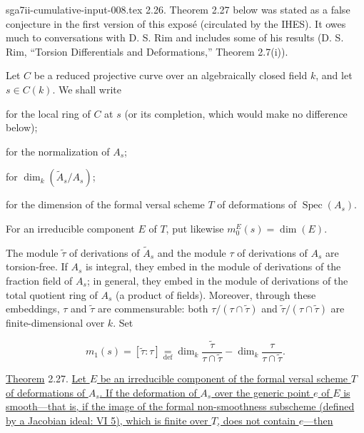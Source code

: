 \begin{filecontents*}{sga7ii-cumulative-input-008.tex}
2.26. Theorem 2.27 below was stated as a false conjecture in the first version
of this exposé (circulated by the IHES).  It owes much to conversations with
D. S. Rim and includes some of his results (D. S. Rim, ``Torsion
Differentials and Deformations,'' Theorem 2.7(i)).


Let $C$ be a reduced projective curve over an algebraically closed field $k$,
and let $s\in C(k)$.  We shall write

\begin{description}[leftmargin=2.7cm,style=nextline]
\item[$A_s$] for the local ring of $C$ at $s$ (or its completion, which would
make no difference below);
\item[$\widetilde A_s$] for the normalization of $A_s$;
\item[$\delta(s)$] for $\dim_k(\widetilde A_s/A_s)$;
\item[$m_0(s)$] for the dimension of the formal versal scheme $T$ of
deformations of $\operatorname{Spec}(A_s)$.
\end{description}

For an irreducible component $E$ of $T$, put likewise
$m_0^E(s)=\dim(E)$.

The module $\widetilde\tau$ of derivations of $\widetilde A_s$ and the module
$\tau$ of derivations of $A_s$ are torsion-free.  If $A_s$ is integral, they
embed in the module of derivations of the fraction field of $A_s$; in general,
they embed in the module of derivations of the total quotient ring of $A_s$
(a product of fields).  Moreover, through these embeddings, $\tau$ and
$\widetilde\tau$ are commensurable: both
$\tau/(\tau\cap\widetilde\tau)$ and
$\widetilde\tau/(\tau\cap\widetilde\tau)$ are finite-dimensional over $k$.
Set

\begin{equation*}
m_1(s)=[\widetilde\tau:\tau]
\mathrel{\mathop=\limits_{\mathrm{def}}}
\dim_k\frac{\widetilde\tau}{\tau\cap\widetilde\tau}
-\dim_k\frac{\tau}{\tau\cap\widetilde\tau}.
\end{equation*}

\underline{Theorem} 2.27. \underline{Let $E$ be an irreducible component of
the formal versal scheme $T$ of deformations of $A_s$. If the deformation of
$A_s$ over the generic point $e$ of $E$ is smooth---that is, if the image of
the formal non-smoothness subscheme (defined by a Jacobian ideal: VI 5), which
is finite over $T$, does not contain $e$---then}


\end{filecontents*}
